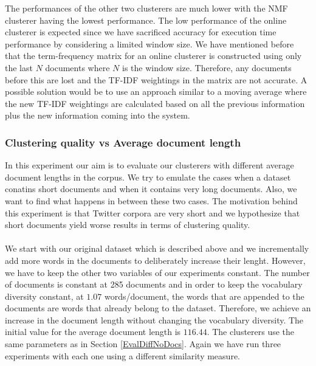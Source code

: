 The performances of the other two clusterers are much lower with the NMF clusterer having the lowest performance. The low performance of the online clusterer is expected since we have sacrificed accuracy for execution time performance by considering a limited window size. We have mentioned before that the term-frequency matrix for an online clusterer is constructed using only the last $N$ documents where $N$ is the window size. Therefore, any documents before this are lost and the TF-IDF weightings in the matrix are not accurate. A possible solution would be to use an approach similar to a moving average where the new TF-IDF weightings are calculated based on all the previous information plus the new information coming into the system.   

\subsubsection{Clustering quality vs Average document length}
In this experiment our aim is to evaluate our clusterers with different average document lengths in the corpus. We try to emulate the cases when a dataset conatins short documents and when it contains very long documents. Also, we want to find what happens in between these two cases. The motivation behind this experiment is that Twitter corpora are very short and we hypothesize that short documents yield worse results in terms of clustering quality.\\\\
We start with our original dataset which is described above and we incrementally add more words in the documents to deliberately increase their lenght. However, we have to keep the other two variables of our experiments constant. The number of documents is constant at 285 documents and in order to keep the vocabulary diversity constant, at $1.07$ words/document, the words that are appended to the documents are words that already belong to the dataset. Therefore, we achieve an increase in the document length without changing the vocabulary diversity. The initial value for the average document length is $116.44$. The clusterers use the same parameters as in Section \ref{EvalDiffNoDocs}. Again we have run three experiments with each one using a different similarity measure.\\\\  
